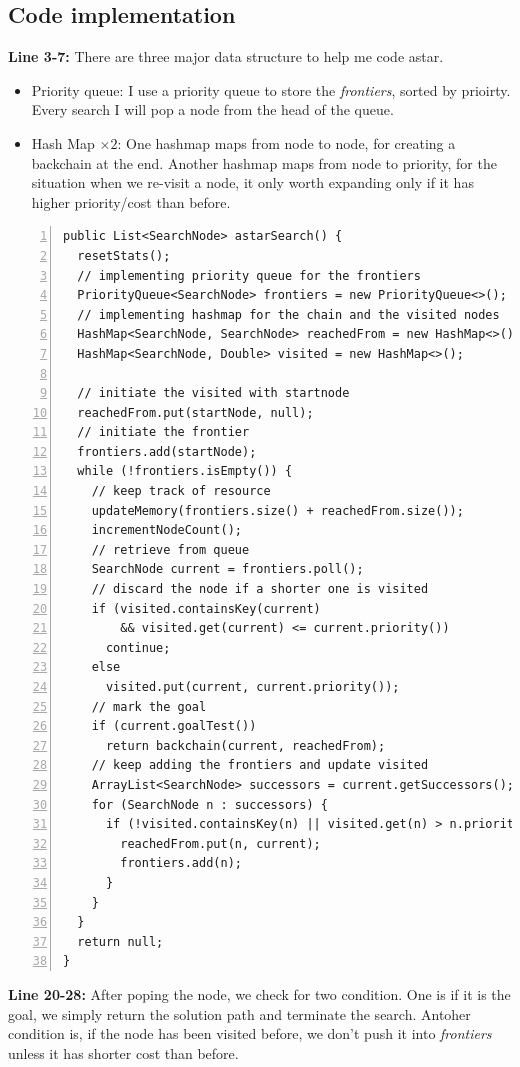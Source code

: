 \subsection{Code implementation}
\textbf{Line 3-7:} There are three major data structure to help me code astar.
\begin{itemize}
  \item Priority queue: I use a priority queue to store the \emph{frontiers}, sorted by prioirty. Every search I will pop a node from the head of the queue. 
  \item Hash Map $\times 2$: One hashmap maps from node to node, for creating a backchain at the end. Another hashmap maps from node to priority, for the situation when we re-visit a node, it only worth expanding only if it has higher priority/cost than before.
\end{itemize}

\begin{lstlisting}[numbers=left]
public List<SearchNode> astarSearch() {
  resetStats();
  // implementing priority queue for the frontiers
  PriorityQueue<SearchNode> frontiers = new PriorityQueue<>();
  // implementing hashmap for the chain and the visited nodes
  HashMap<SearchNode, SearchNode> reachedFrom = new HashMap<>();
  HashMap<SearchNode, Double> visited = new HashMap<>();

  // initiate the visited with startnode
  reachedFrom.put(startNode, null);
  // initiate the frontier
  frontiers.add(startNode);
  while (!frontiers.isEmpty()) {
    // keep track of resource
    updateMemory(frontiers.size() + reachedFrom.size());
    incrementNodeCount();
    // retrieve from queue
    SearchNode current = frontiers.poll();
    // discard the node if a shorter one is visited
    if (visited.containsKey(current)
        && visited.get(current) <= current.priority())
      continue;
    else
      visited.put(current, current.priority());
    // mark the goal
    if (current.goalTest())
      return backchain(current, reachedFrom);
    // keep adding the frontiers and update visited
    ArrayList<SearchNode> successors = current.getSuccessors();
    for (SearchNode n : successors) {
      if (!visited.containsKey(n) || visited.get(n) > n.priority()) {
        reachedFrom.put(n, current);
        frontiers.add(n);
      }
    }
  }
  return null;
}
\end{lstlisting}

\textbf{Line 20-28:} After poping the node, we check for two condition. One is if it is the goal, we simply return the solution path and terminate the search. Antoher condition is, if the node has been visited before, we don't push it into \emph{frontiers} unless it has shorter cost than before.


